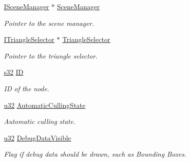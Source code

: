 \begin{DoxyCompactItemize}
\hyperlink{classirr_1_1scene_1_1ISceneManager}{I\+Scene\+Manager} $\ast$ \hyperlink{classirr_1_1scene_1_1ISceneNode_a679d313cbe74b0c62285494a54334311}{Scene\+Manager}
\begin{DoxyCompactList}\small\item\em Pointer to the scene manager. \end{DoxyCompactList}\item 
\mbox{\label{classirr_1_1scene_1_1ISceneNode_a91a8af9768196d3fd00f79f8a441600c}} 
\hyperlink{classirr_1_1scene_1_1ITriangleSelector}{I\+Triangle\+Selector} $\ast$ \hyperlink{classirr_1_1scene_1_1ISceneNode_a91a8af9768196d3fd00f79f8a441600c}{Triangle\+Selector}
\begin{DoxyCompactList}\small\item\em Pointer to the triangle selector. \end{DoxyCompactList}\item 
\mbox{\label{classirr_1_1scene_1_1ISceneNode_a001b5cf9866fae4092b9b2cc89f3ebef}} 
\hyperlink{namespaceirr_ac66849b7a6ed16e30ebede579f9b47c6}{s32} \hyperlink{classirr_1_1scene_1_1ISceneNode_a001b5cf9866fae4092b9b2cc89f3ebef}{ID}
\begin{DoxyCompactList}\small\item\em ID of the node. \end{DoxyCompactList}\item 
\mbox{\label{classirr_1_1scene_1_1ISceneNode_a0906d6df682ef3b1cbbe117907c0b995}} 
\hyperlink{namespaceirr_a0416a53257075833e7002efd0a18e804}{u32} \hyperlink{classirr_1_1scene_1_1ISceneNode_a0906d6df682ef3b1cbbe117907c0b995}{Automatic\+Culling\+State}
\begin{DoxyCompactList}\small\item\em Automatic culling state. \end{DoxyCompactList}\item 
\mbox{\label{classirr_1_1scene_1_1ISceneNode_a223a66d82d1c56e5f3730aeb9f83589c}} 
\hyperlink{namespaceirr_a0416a53257075833e7002efd0a18e804}{u32} \hyperlink{classirr_1_1scene_1_1ISceneNode_a223a66d82d1c56e5f3730aeb9f83589c}{Debug\+Data\+Visible}
\begin{DoxyCompactList}\small\item\em Flag if debug data should be drawn, such as Bounding Boxes. \end{DoxyCompactList}\item 

\end{DoxyCompactItemize}
